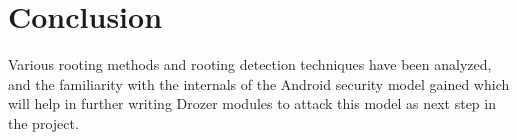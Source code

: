 \chapter{Conclusion}

Various rooting methods and rooting detection techniques have been analyzed, and the familiarity with the internals of the Android security model gained which will help in further writing Drozer modules to attack this model as next step in the project.